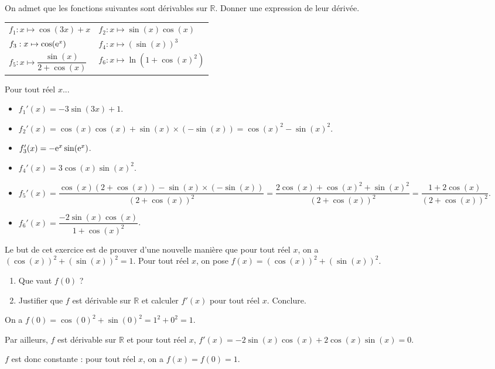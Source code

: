 \documentclass[11pt,fleqn, openany]{book} %
\begin{document}
\begin{exercise}On admet que les fonctions suivantes sont dérivables sur $\mathbb{R}$. Donner une expression de leur dérivée.

\renewcommand{\arraystretch}{1}
\begin{tabularx}{\linewidth}{XX}
 $f_1 : x \mapsto \cos(3x)+x$
& $f_2: x \mapsto \sin(x)\cos(x)$ \\
 $f_3 : x \mapsto \cos(\mathrm{e}^x)$
&$f_4 :x \mapsto (\sin(x))^3$ \\
$f_5 : x\mapsto \dfrac{\sin(x)}{2+\cos(x)}$ & $f_6:x\mapsto \ln(1+\cos(x)^2)$
\end{tabularx}
\end{exercise}

\begin{solution}Pour tout réel $x$...

\begin{itemize}
\item $f_1'(x)=-3\sin(3x)+1$.
\vskip5pt
\item $f_2'(x)=\cos(x)\cos(x)+\sin(x) \times (-\sin(x))=\cos(x)^2-\sin(x)^2$.
\vskip5pt
\item $f_3'(x)=-\mathrm{e}^x\sin(\mathrm{e}^x)$.
\vskip5pt
\item $f_4'(x)=3\cos(x)\sin(x)^2$.
\vskip5pt
\item $f_5'(x)=\dfrac{\cos(x)(2+ \cos(x))-\sin(x)\times(-\sin(x))}{(2+\cos(x))^2}=\dfrac{2\cos(x)+\cos(x)^2+\sin(x)^2}{(2+\cos(x))^2}=\dfrac{1+2\cos(x)}{(2+\cos(x))^2}$.
\vskip5pt
\item $f_6'(x)=\dfrac{-2\sin(x)\cos(x)}{1+\cos(x)^2}$.
\end{itemize}
\end{solution}



\begin{exercise}Le but de cet exercice est de prouver d'une nouvelle manière que pour tout réel $x$, on a \\$(\cos(x))^2+(\sin(x))^2=1$. 
Pour tout réel $x$, on pose $f(x)=(\cos(x))^2+(\sin(x))^2$.
\begin{enumerate}
\item Que vaut $f(0)$ ?
\item Justifier que $f$ est dérivable sur $\mathbb{R}$ et calculer $f'(x)$ pour tout réel $x$. Conclure.
\end{enumerate}\end{exercise}

\begin{solution}On a $f(0)=\cos(0)^2+\sin(0)^2=1^2+0^2=1$.

Par ailleurs, $f$ est dérivable sur $\mathbb{R}$ et pour tout réel $x$, $f'(x)=-2\sin(x)\cos(x)+2\cos(x)\sin(x)=0$. 

$f$ est donc constante : pour tout réel $x$, on a $f(x)=f(0)=1$.\newpage
\end{solution}
\end{document}
